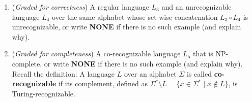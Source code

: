 \documentclass[12pt, oneside]{article}
\newcommand{\gradeCorrect}{({\it Graded for correctness}) }
\newcommand{\gradeComplete}{({\it Graded for completeness}) }
\begin{document}
\begin{enumerate}[wide, labelwidth=!, labelindent=0pt]
\begin{enumerate}
    \item\gradeCorrect A regular language $L_3$ and an unrecognizable
        language $L_4$ over the same alphabet whose set-wise concatenation $L_3 \circ L_4$ is unrecognizable, 
        or write {\bf NONE} if there is no such example (and explain why).
    
    
    \item\gradeComplete A co-recognizable language $L_5$ that is NP-complete,
         or write {\bf NONE} if there is no such example (and explain why).
        Recall the definition: A language $L$ over an  alphabet $\Sigma$ is called {\bf co-recognizable} if its complement,  defined
        as $\Sigma^* \setminus L  = \{ x  \in  \Sigma^* \mid x \notin  L \}$, is Turing-recognizable.
        
\end{enumerate}
    

\end{enumerate}
\end{document}
